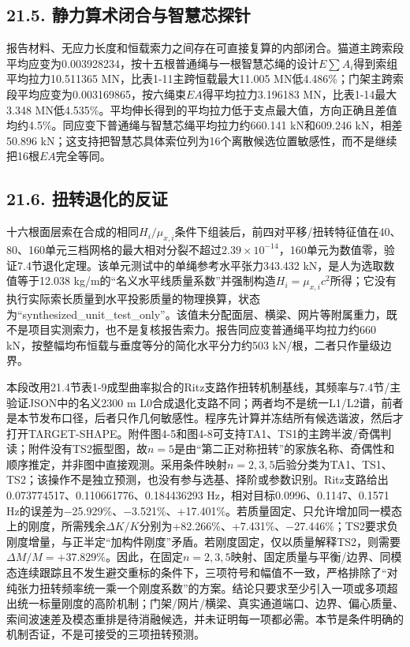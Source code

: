 \documentclass[UTF8,a4paper,11pt,fontset=none]{ctexart}
\begin{document}
\subsection*{21.5. 静力算术闭合与智慧芯探针}
报告材料、无应力长度和恒载索力之间存在可直接复算的内部闭合。猫道主跨索段平均应变为0.003928234，按十五根普通绳与一根智慧芯绳的设计\(E\sum A_i\)\allowbreak{}得到索组平均拉力10.511365 MN，比表1-11主跨恒载最大11.005 MN低4.486\%；门架主跨索段平均应变为0.003169865，按六绳束\(EA\)\allowbreak{}得平均拉力3.196183 MN，比表1-14最大3.348 MN低4.535\%。平均伸长得到的平均拉力低于支点最大值，方向正确且差值均约4.5\%。同应变下普通绳与智慧芯绳平均拉力约660.141 kN和609.246 kN，相差50.896 kN；这支持把智慧芯具体索位列为16个离散候选位置敏感性，而不是继续把16根\(EA\)\allowbreak{}完全等同。\par
{}
\subsection*{21.6. 扭转退化的反证}
十六根面层索在合成的相同\(H_i/\mu_{x,\allowbreak i}\)\allowbreak{}条件下组装后，前四对平移/扭转特征值在40、80、160单元三档网格的最大相对分裂不超过\(2.39\times10^{-14}\)\allowbreak{}，160单元为数值零，验证7.4节退化定理。该单元测试中的单绳参考水平张力343.432 kN，是人为选取数值等于12.038 kg/m的“名义水平线质量系数”并强制构造\(H_i=\mu_{x,\allowbreak i}c^2\)\allowbreak{}所得；它没有执行实际索长质量到水平投影质量的物理换算，状态为“synthesized\_unit\_test\_only”。该值未分配面层、横梁、网片等附属重力，既不是项目实测索力，也不是复核报告索力。报告同应变普通绳平均拉力约660 kN，按整幅均布恒载与垂度等分的简化水平分力约503 kN/根，二者只作量级边界。\par
本段改用21.4节表1-9成型曲率拟合的Ritz支路作扭转机制基线，其频率与7.4节/主验证JSON中的名义2300 m L0合成退化支路不同；两者均不是统一L1/L2谱，前者是本节发布口径，后者只作几何敏感性。程序先计算并冻结所有候选谐波，然后才打开TARGET-SHAPE。附件图4-5和图4-8可支持TA1、TS1的主跨半波/奇偶判读；附件没有TS2振型图，故\(n=5\)\allowbreak{}是由“第二正对称扭转”的家族名称、奇偶性和顺序推定，并非图中直接观测。采用条件映射\(n=2,\allowbreak 3,\allowbreak 5\)\allowbreak{}后验分类为TA1、TS1、TS2；该操作不是独立预测，也没有参与选基、择阶或参数识别。Ritz支路给出0.073774517、0.110661776、0.184436293 Hz，相对目标0.0996、0.1147、0.1571 Hz的误差为−25.929\%、−3.521\%、+17.401\%。若质量固定、只允许增加同一模态上的刚度，所需残余\(\Delta K/K\)\allowbreak{}分别为+82.266\%、+7.431\%、−27.446\%；TS2要求负刚度增量，与正半定“加构件刚度”矛盾。若刚度固定，仅以质量解释TS2，则需要\(\Delta M/M=+37.829\%\)\allowbreak{}。因此，在固定\(n=2,\allowbreak 3,\allowbreak 5\)\allowbreak{}映射、固定质量与平衡/边界、同模态连续跟踪且不发生避交重标的条件下，三项符号和幅值不一致，严格排除了“对纯张力扭转频率统一乘一个刚度系数”的方案。结论只要求至少引入一项或多项超出统一标量刚度的高阶机制；门架/网片/横梁、真实通道端口、边界、偏心质量、索间波速差及模态重排是待消融候选，并未证明每一项都必需。本节是条件明确的机制否证，不是可接受的三项扭转预测。\par
{}
\end{document}
